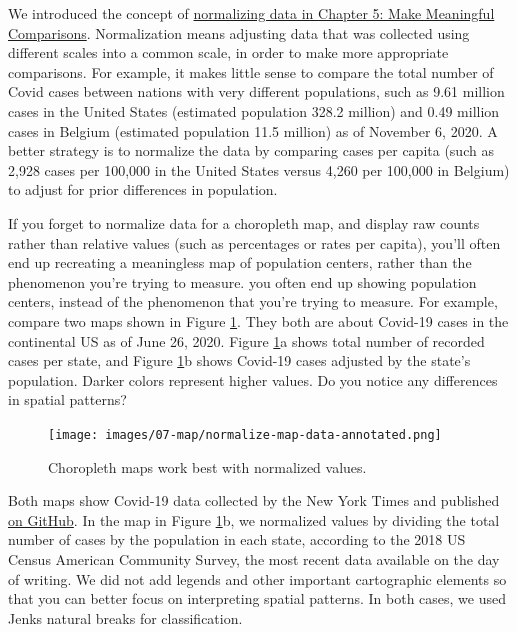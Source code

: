\documentclass[
  english,
]{book}
\begin{document}
We introduced the concept of \href{normalize.html}{normalizing data in Chapter 5: Make Meaningful Comparisons}. Normalization means adjusting data that was collected using different scales into a common scale, in order to make more appropriate comparisons. For example, it makes little sense to compare the total number of Covid cases between nations with very different populations, such as 9.61 million cases in the United States (estimated population 328.2 million) and 0.49 million cases in Belgium (estimated population 11.5 million) as of November 6, 2020. A better strategy is to normalize the data by comparing cases per capita (such as 2,928 cases per 100,000 in the United States versus 4,260 per 100,000 in Belgium) to adjust for prior differences in population.

If you forget to normalize data for a choropleth map, and display raw counts rather than relative values (such as percentages or rates per capita), you'll often end up recreating a meaningless map of population centers, rather than the phenomenon you're trying to measure. you often end up showing population centers, instead of the phenomenon that you're trying to measure. For example, compare two maps shown in Figure \ref{fig:normalize-map-data}. They both are about Covid-19 cases in the continental US as of June 26, 2020. Figure \ref{fig:normalize-map-data}a shows total number of recorded cases per state, and Figure \ref{fig:normalize-map-data}b shows Covid-19 cases adjusted by the state's population. Darker colors represent higher values. Do you notice any differences in spatial patterns?



\begin{figure}
\centering
\texttt{[image: images/07-map/normalize-map-data-annotated.png]}
\caption{\label{fig:normalize-map-data}Choropleth maps work best with normalized values.}
\end{figure}

Both maps show Covid-19 data collected by the New York Times and published \href{https://github.com/nytimes/covid-19-data}{on GitHub}. In the map in Figure \ref{fig:normalize-map-data}b, we normalized values by dividing the total number of cases by the population in each state, according to the 2018 US Census American Community Survey, the most recent data available on the day of writing. We did not add legends and other important cartographic elements so that you can better focus on interpreting spatial patterns. In both cases, we used Jenks natural breaks for classification.
\end{document}
